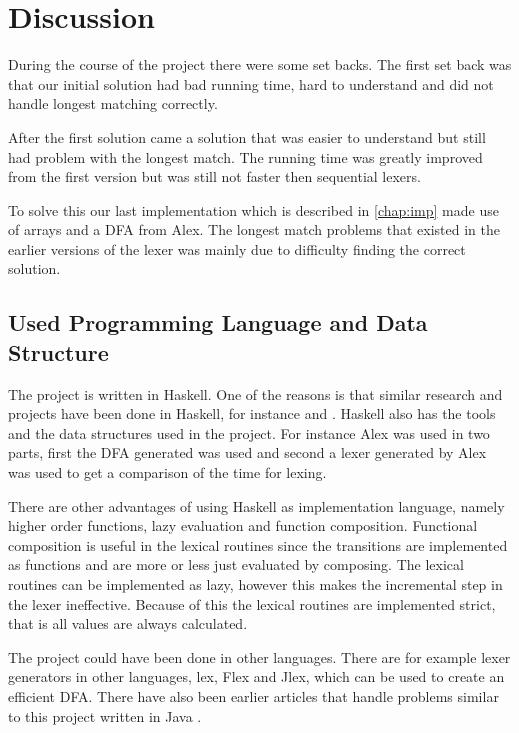 \chapter{Discussion}
During the course of the project there were some set backs. The first set back
was that our initial solution had bad running time, hard to understand and did
not handle longest matching correctly.

After the first solution came a solution
that was easier to understand but still had problem with the longest match. The
running time was greatly improved from the first version but was still not
faster then sequential lexers.

To solve this our last implementation which is
described in \cref{chap:imp} made use of arrays and a DFA from
Alex. The longest match problems that existed in the earlier versions of the
lexer was mainly due to difficulty finding the correct solution.

\section{Used Programming Language and Data Structure}
The project is written in Haskell. One of the reasons is that similar
research and projects have been done in Haskell, for instance \cite{blog} and \cite{fingertree}.
Haskell also has the tools and the data structures used in the project. For
instance Alex was used in two parts, first the DFA generated was used and second
a lexer generated by Alex was used to get a comparison of the time for lexing.

There are other advantages of using Haskell as implementation language, namely
higher order functions, lazy evaluation and function composition. Functional
composition is useful in the lexical routines since the transitions are
implemented as functions and are more or less just evaluated by composing.
The lexical routines can be implemented as lazy, however this makes the
incremental step in the lexer ineffective. Because of this the lexical routines
are implemented strict, that is all values are always calculated.

The project could have been done in other languages. There are for example
lexer generators in other languages, lex, Flex and Jlex, which can be used to
create an efficient DFA. There have also been earlier articles that handle
problems similar to this project written in Java \cite{JavaIncRegExp}.

